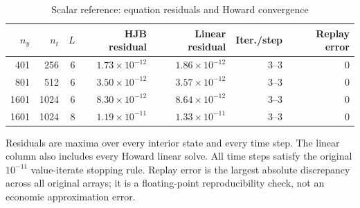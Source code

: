 \begin{table}[!htbp]
\centering\small\setlength{\tabcolsep}{3pt}
\caption{Scalar reference: equation residuals and Howard convergence}
\label{tab:r14-reference-residuals}
\begin{tabular}{rrrrrrr}
\toprule
$n_y$ & $n_t$ & $L$ & HJB residual & Linear residual & Iter./step & Replay error \\
\midrule
401 & 256 & 6 & $1.73\times10^{-12}$ & $1.86\times10^{-12}$ & 3--3 & 0 \\
801 & 512 & 6 & $3.50\times10^{-12}$ & $3.57\times10^{-12}$ & 3--3 & 0 \\
1601 & 1024 & 6 & $8.30\times10^{-12}$ & $8.64\times10^{-12}$ & 3--3 & 0 \\
1601 & 1024 & 8 & $1.19\times10^{-11}$ & $1.33\times10^{-11}$ & 3--3 & 0 \\
\bottomrule
\end{tabular}
\par\medskip
\begin{minipage}{0.97\textwidth}\footnotesize
Residuals are maxima over every interior state and every time step. The linear column also includes every Howard linear solve. All time steps satisfy the original $10^{-11}$ value-iterate stopping rule. Replay error is the largest absolute discrepancy across all original arrays; it is a floating-point reproducibility check, not an economic approximation error.
\end{minipage}
\end{table}

